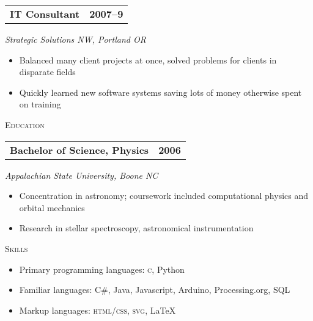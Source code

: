 \documentclass[letterpaper,10pt]{article}
\makeatletter
\newcommand{\resumeheader}[1]{
  \vspace{0.05in}
  \textsc{\Large #1}
  \vspace{0.10in}
}
\newcommand{\resumeitem}[4]{
  {\addtolength{\leftskip}{0.21in}
    \begin{tabular*}{6.25in}{l@{\extracolsep{\fill}} r}
      {\textbf{#1}} & {\textbf{#2}} \\
    \end{tabular*}
    
  }
  
  \vspace{0.01in}
  {\addtolength{\leftskip}{0.3in}
    \textit{#3}
  
  }
  
  \vspace{0.09in}
  {\addtolength{\leftskip}{0.3in}
    \small
    \begin{minipage}{5in}
      #4
    \end{minipage}
    
  }
  
  \vspace{0.15in}
}
\makeatother
\begin{document}
\resumeitem{IT Consultant}{2007--9}%
           {Strategic Solutions NW, Portland OR}%
           {
              \begin{itemize}[topsep=1pt, itemsep=0pt, parsep=0pt]
                \renewcommand{\labelitemi}{---}
                \item Balanced many client projects at once, solved problems for clients in disparate fields
                \item Quickly learned new software systems saving lots of money otherwise spent on training
              \end{itemize}
           }
           
\resumeheader{Education}

\resumeitem{Bachelor of Science, Physics} {2006}%
           {Appalachian State University, Boone NC}%
           {
              \begin{itemize}[topsep=1pt, itemsep=0pt, parsep=0pt]
                \renewcommand{\labelitemi}{---}
                \item Concentration in astronomy; coursework included computational physics and orbital mechanics
                \item Research in stellar spectroscopy, astronomical instrumentation
              \end{itemize}
           }
           
\resumeheader{Skills} 

\begin{itemize}[topsep=1pt, itemsep=0pt, parsep=0pt]
  \renewcommand{\labelitemi}{---}
  \item Primary programming languages: \textsc{c}, Python
  \item Familiar languages: C\#, Java, Javascript, Arduino, Processing.org, SQL
  \item Markup languages: \textsc{html}/\textsc{css}, \textsc{svg}, \LaTeX
\end{itemize}
              
\end{document}
